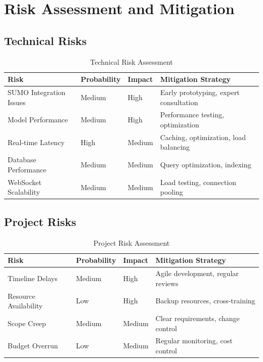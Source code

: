 \documentclass[12pt,a4paper]{article}
\begin{document}
\section{Risk Assessment and Mitigation}

\subsection{Technical Risks}

\begin{table}[h]
\centering
\begin{tabular}{|l|l|l|l|}
\hline
\textbf{Risk} & \textbf{Probability} & \textbf{Impact} & \textbf{Mitigation Strategy} \\
\hline
SUMO Integration Issues & Medium & High & Early prototyping, expert consultation \\
Model Performance & Medium & High & Performance testing, optimization \\
Real-time Latency & High & Medium & Caching, optimization, load balancing \\
Database Performance & Medium & Medium & Query optimization, indexing \\
WebSocket Scalability & Medium & Medium & Load testing, connection pooling \\
\hline
\end{tabular}
\caption{Technical Risk Assessment}
\label{tab:technical_risks}
\end{table}

\subsection{Project Risks}

\begin{table}[h]
\centering
\begin{tabular}{|l|l|l|l|}
\hline
\textbf{Risk} & \textbf{Probability} & \textbf{Impact} & \textbf{Mitigation Strategy} \\
\hline
Timeline Delays & Medium & High & Agile development, regular reviews \\
Resource Availability & Low & High & Backup resources, cross-training \\
Scope Creep & Medium & Medium & Clear requirements, change control \\
Budget Overrun & Low & Medium & Regular monitoring, cost control \\
\hline
\end{tabular}
\caption{Project Risk Assessment}
\label{tab:project_risks}
\end{table}
\end{document}
